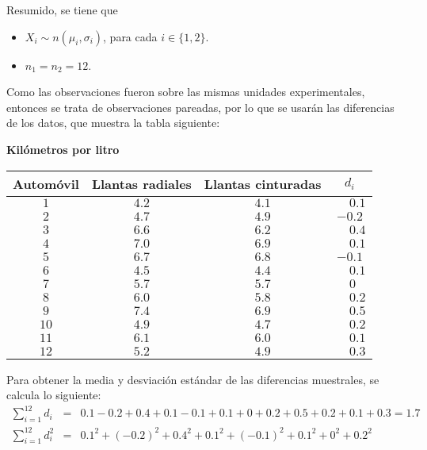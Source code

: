 \begin{solucion}
 \begin{datos}
  Resumido, se tiene que
  \begin{itemize}
   \item $X_i \sim n\left( \mu_i, \sigma_i \right)$,
   para cada $i \in \{ 1, 2 \}$.
   \item $n_1 = n_2 = 12$.
  \end{itemize}
  Como las observaciones fueron sobre las mismas unidades
  experimentales, entonces se trata de observaciones pareadas,
  por lo que se usar\'an las diferencias de los datos,
  que muestra la tabla siguiente:
  \begin{center}
   \textbf{Kil\'ometros por litro} \\
   \begin{tabular}{cccc}
    \hline 
    \textbf{Autom\'ovil} & \textbf{Llantas radiales} & \textbf{Llantas cinturadas} & \hspace{1cm} $d_i$ \hspace{1cm} \\
    \hline
    $1$  & $4.2$ & $4.1$ & $\phantom{-}0.1$ \\
    $2$  & $4.7$ & $4.9$ & $-0.2$ \\
    $3$  & $6.6$ & $6.2$ & $\phantom{-}0.4$ \\
    $4$  & $7.0$ & $6.9$ & $\phantom{-}0.1$ \\
    $5$  & $6.7$ & $6.8$ & $-0.1$ \\
    $6$  & $4.5$ & $4.4$ & $\phantom{-}0.1$ \\
    $7$  & $5.7$ & $5.7$ & $\phantom{-}0\phantom{.1}$ \\
    $8$  & $6.0$ & $5.8$ & $\phantom{-}0.2$ \\
    $9$  & $7.4$ & $6.9$ & $\phantom{-}0.5$ \\
    $10$ & $4.9$ & $4.7$ & $\phantom{-}0.2$ \\
    $11$ & $6.1$ & $6.0$ & $\phantom{-}0.1$ \\
    $12$ & $5.2$ & $4.9$ & $\phantom{-}0.3$
   \end{tabular}
  \end{center}
  Para obtener la media y desviaci\'on est\'andar
  de las diferencias muestrales, se calcula lo siguiente:
  \begin{eqnarray*}
   \sum_{i=1}^{12} d_i & = &
   0.1 - 0.2 + 0.4 + 0.1 - 0.1 + 0.1 + 0 + 0.2 + 0.5 + 0.2 + 0.1 + 0.3
   = 1.7 \\
   \sum_{i=1}^{12} d_i^2 & = &
   0.1^2 + (-0.2)^2 + 0.4^2 + 0.1^2 + (-0.1)^2 + 0.1^2 + 0^2 + 0.2^2

\end{eqnarray*}
\end{datos}
\end{solucion}
